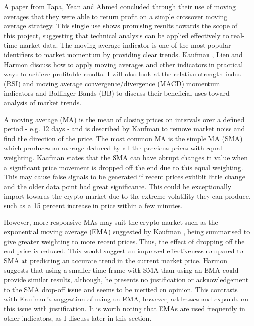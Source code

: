 A paper from Tapa, Yean and Ahmed \cite{ART:Tapa:2016} concluded through their use of moving averages that they were able to return profit on a simple crossover moving average strategy. This single use shows promising results towards the scope of this project, suggesting that technical analysis can be applied effectively to real-time market data. The moving average indicator is one of the most popular identifiers to market momentum by providing clear trends. Kaufman \cite{BOOK:Kaufman:2013}, Lien \cite{BOOK:Lien:2016} and Harmon \cite{BOOK:Harmon:2014} discuss how to apply moving averages and other indicators in practical ways to achieve profitable results. I will also look at the relative strength index (RSI) and moving average convergence/divergence (MACD) momentum indicators and Bollinger Bands (BB) to discuss their beneficial uses toward analysis of market trends.

A moving average (MA) is the mean of closing prices on intervals over a defined period - e.g. 12 days - and is described by Kaufman \cite{BOOK:Kaufman:2013} to remove market noise and find the direction of the price. The most common MA is the simple MA (SMA) which produces an average deduced by all the previous prices with equal weighting. Kaufman \cite{BOOK:Kaufman:2013} states that the SMA can have abrupt changes in value when a significant price movement is dropped off the end due to this equal weighting. This may cause false signals to be generated if recent prices exhibit little change and the older data point had great significance. This could be exceptionally import towards the crypto market due to the extreme volatility they can produce, such as a 15 percent increase in price within a few minutes. 

However, more responsive MAs may suit the crypto market such as the exponential moving average (EMA) suggested by Kaufman \cite{BOOK:Kaufman:2013}, being summarised to give greater weighting to more recent prices. Thus, the effect of dropping off the end price is reduced. This would suggest an improved effectiveness compared to SMA at predicting an accurate trend in the current market price. Harmon \cite{BOOK:Harmon:2014} suggests that using a smaller time-frame with SMA than using an EMA could provide similar results, although, he presents no justification or acknowledgement to the SMA drop-off issue and seems to be merited on opinion. This contrasts with Kaufman's \cite{BOOK:Kaufman:2013} suggestion of using an EMA, however, addresses and expands on this issue with justification. It is worth noting that EMAs are used frequently in other indicators, as I discuss later in this section.
    
